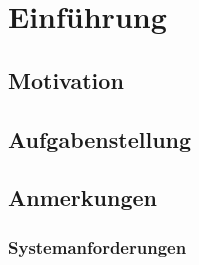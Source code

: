 \chapter{Einführung}


\section{Motivation}


\section{Aufgabenstellung}


\section{Anmerkungen}


\subsection{Systemanforderungen}


